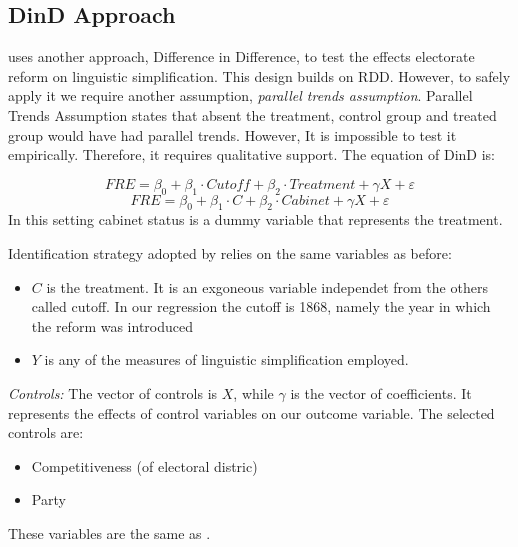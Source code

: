 
\subsection{DinD Approach}
\textcite{spirlingDemocratizationLinguisticComplexity2016} uses another approach, Difference in Difference, to test the effects electorate reform on linguistic simplification. This design builds on RDD\@. However, to safely apply it we require another assumption, \textit{parallel trends assumption}. Parallel Trends Assumption states that absent the treatment, control group and treated group would have had parallel trends. However, It is impossible to test it empirically. Therefore, it requires qualitative support. The equation of DinD is:

\vspace*{0.3em}
\[
FRE = \beta_0 + \beta_1 \cdot Cutoff + \beta_2 \cdot Treatment + \gamma X + \varepsilon
\]
\vspace*{0.1em}
\[
FRE = \beta_0 + \beta_1 \cdot C + \beta_2 \cdot Cabinet + \gamma X + \varepsilon
\]
In this setting cabinet status is a dummy variable that represents the treatment.

\vspace*{1em}
Identification strategy adopted by \textcite{spirlingDemocratizationLinguisticComplexity2016} relies on the same variables as before:
\begin{itemize}
    \item[-] \small{\(C\)} is the treatment. It is an exgoneous variable independet from the others called cutoff. In our regression the cutoff is 1868, namely the year in which the reform was introduced
    \item[-] \small{\(Y\)} is any of the measures of linguistic simplification employed.
\end{itemize}

\vspace*{1em}
\textit{Controls:} The vector of controls is \small{\(X\)}, while \small{\(\gamma\)} is the vector of coefficients. It represents the effects of control variables on our outcome variable. The selected controls are:
\begin{itemize}
    \item[-] Competitiveness (of electoral distric)
    \item[-] Party
\end{itemize}
These variables are the same as \textcite{spirlingDemocratizationLinguisticComplexity2016}.

